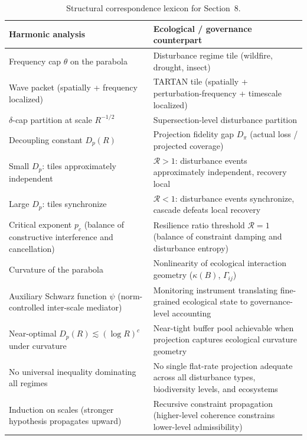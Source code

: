 \documentclass[12pt]{article}
\begin{document}
\begin{table}[h]
\centering
\caption{Structural correspondence lexicon for Section~8.}
\label{tab:lexicon}
\renewcommand{\arraystretch}{1.3}
\begin{tabular}{@{}p{4.8cm}p{7.0cm}@{}}
\toprule
\textbf{Harmonic analysis} & \textbf{Ecological / governance counterpart} \\
\midrule
Frequency cap $\theta$ on the parabola
  & Disturbance regime tile (wildfire, drought, insect) \\
Wave packet (spatially + frequency localized)
  & TARTAN tile (spatially + perturbation-frequency + timescale localized) \\
$\delta$-cap partition at scale $R^{-1/2}$
  & Supersection-level disturbance partition \\
Decoupling constant $D_p(R)$
  & Projection fidelity gap $D_\pi$ (actual loss / projected coverage) \\
Small $D_p$: tiles approximately independent
  & $\mathcal{R}>1$: disturbance events approximately independent, recovery local \\
Large $D_p$: tiles synchronize
  & $\mathcal{R}<1$: disturbance events synchronize, cascade defeats local recovery \\
Critical exponent $p_c$ (balance of constructive interference and cancellation)
  & Resilience ratio threshold $\mathcal{R}=1$ (balance of constraint damping and disturbance entropy) \\
Curvature of the parabola
  & Nonlinearity of ecological interaction geometry ($\kappa(B)$, $\Gamma_{ij}$) \\
Auxiliary Schwarz function $\psi$ (norm-controlled inter-scale mediator)
  & Monitoring instrument translating fine-grained ecological state to governance-level accounting \\
Near-optimal $D_p(R)\lesssim(\log R)^c$ under curvature
  & Near-tight buffer pool achievable when projection captures ecological curvature geometry \\
No universal inequality dominating all regimes
  & No single flat-rate projection adequate across all disturbance types, biodiversity levels, and ecosystems \\
Induction on scales (stronger hypothesis propagates upward)
  & Recursive constraint propagation (higher-level coherence constrains lower-level admissibility) \\
\bottomrule
\end{tabular}
\end{table}
\end{document}
